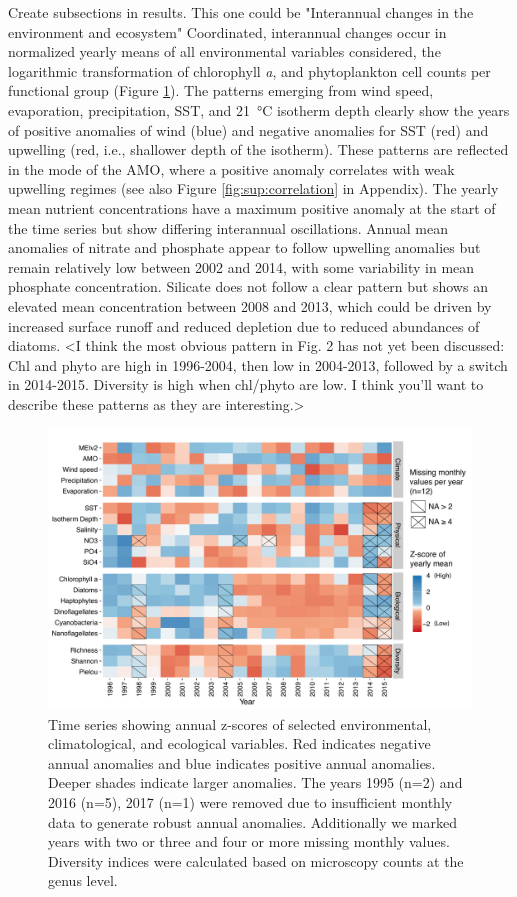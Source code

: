 \documentclass[draft]{agujournal2019}
\begin{document}
Create subsections in results. This one could be "Interannual changes in the environment and ecosystem"
Coordinated, interannual changes occur in normalized yearly means of all environmental variables considered, the logarithmic transformation of chlorophyll \textit{a}, and phytoplankton cell counts per functional group (Figure \ref{fig:zscore}). The patterns emerging from wind speed, evaporation, precipitation, SST, and \qty{21}{\celsius} isotherm depth clearly show the years of positive anomalies of wind (blue) and negative anomalies for SST (red) and upwelling (red, i.e., shallower depth of the isotherm). These patterns are reflected in the mode of the AMO, where a positive anomaly correlates with weak upwelling regimes (see also Figure \ref{fig:sup:correlation} in Appendix). The yearly mean nutrient concentrations have a maximum positive anomaly at the start of the time series but show differing interannual oscillations. Annual mean anomalies of nitrate and phosphate appear to follow upwelling anomalies but remain relatively low between 2002 and 2014, with some variability in mean phosphate concentration. Silicate does not follow a clear pattern but shows an elevated mean concentration between 2008 and 2013, which could be driven by increased surface runoff \cite{lorenzoni_characterization_2015} and reduced depletion due to reduced abundances of diatoms.  <I think the most obvious pattern in Fig. 2 has not yet been discussed: Chl and phyto are high in 1996-2004, then low in 2004-2013, followed by a switch in 2014-2015. Diversity is high when chl/phyto are low. I think you'll want to describe these patterns as they are interesting.>

\begin{figure}
\noindent\includegraphics[width=\textwidth]{fig/Figure2_ZScores_v2.pdf}
\caption{Time series showing annual z-scores of selected environmental, climatological, and ecological variables. Red indicates negative annual anomalies and blue indicates positive annual anomalies. Deeper shades indicate larger anomalies. The years 1995 (n=2) and 2016 (n=5), 2017 (n=1) were removed due to insufficient monthly data to generate robust annual anomalies. Additionally we marked years with two or three and four or more missing monthly values. Diversity indices were calculated based on microscopy counts at the genus level.}
\label{fig:zscore}
\end{figure}
\end{document}
